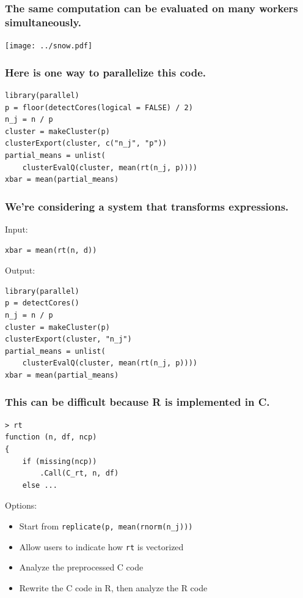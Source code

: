 \documentclass{beamer}
\begin{document}
\begin{frame}

    \frametitle{The same computation can be evaluated on many workers
    simultaneously.}

\centerline{\texttt{[image: ../snow.pdf]}}

\end{frame}
\begin{frame}[fragile]

    \frametitle{Here is one way to parallelize this code.}

\begin{verbatim}
library(parallel)
p = floor(detectCores(logical = FALSE) / 2)
n_j = n / p
cluster = makeCluster(p)
clusterExport(cluster, c("n_j", "p"))
partial_means = unlist(
    clusterEvalQ(cluster, mean(rt(n_j, p))))
xbar = mean(partial_means)
\end{verbatim}

\end{frame}
\begin{frame}[fragile]

    \frametitle{We're considering a system that transforms expressions.}

    Input:

\begin{verbatim}
xbar = mean(rt(n, d))
\end{verbatim}

    Output:

\begin{verbatim}
library(parallel)
p = detectCores()
n_j = n / p
cluster = makeCluster(p)
clusterExport(cluster, "n_j")
partial_means = unlist(
    clusterEvalQ(cluster, mean(rt(n_j, p))))
xbar = mean(partial_means)
\end{verbatim}

\end{frame}
\begin{frame}[fragile]

    \frametitle{This can be difficult because R is implemented in C.}

\begin{verbatim}
> rt
function (n, df, ncp)
{
    if (missing(ncp))
        .Call(C_rt, n, df)
    else ...
\end{verbatim}

\pause

    Options:

    \begin{itemize}
        \item Start from \texttt{replicate(p, mean(rnorm(n\_j)))}
        \item Allow users to indicate how \texttt{rt} is vectorized
        \item Analyze the preprocessed C code
        \item Rewrite the C code in R, then analyze the R code
    \end{itemize}

\end{frame}
\end{document}
